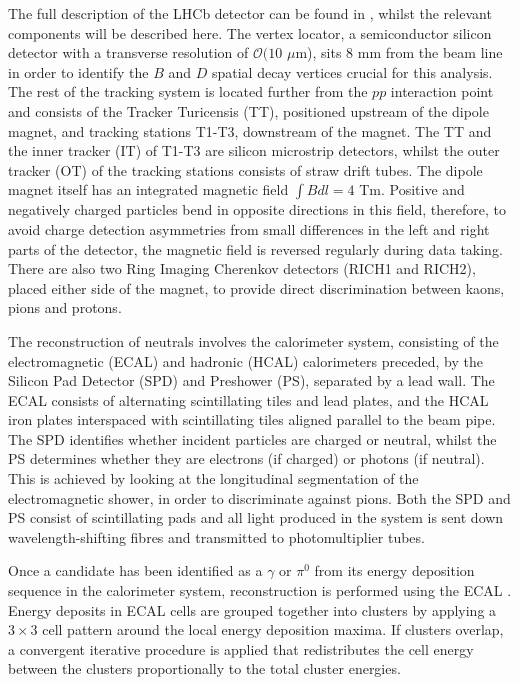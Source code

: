 \documentclass[oneside,12pt]{article}
\begin{document}
The full description of the LHCb detector can be found in \cite{LHCbDetector},
whilst the relevant components will be described here.  The vertex locator, a
semiconductor silicon detector with a transverse resolution of $\mathcal{O}(10$
$\mu$m), sits $8$ mm from the beam line in order to identify the $B$ and $D$
spatial decay vertices crucial for this analysis. The rest of the tracking
system is located further from the $pp$ interaction point and consists of the
Tracker Turicensis (TT), positioned upstream of the dipole magnet, and tracking
stations T1-T3, downstream of the magnet. The TT and the inner tracker (IT) of
T1-T3 are silicon microstrip detectors, whilst the outer tracker (OT) of the
tracking stations consists of straw drift tubes. The dipole magnet itself has an
integrated magnetic field $\int B dl = 4$ Tm.  Positive and negatively charged
particles bend in opposite directions in this field, therefore, to avoid charge
detection asymmetries from small differences in the left and right parts of the
detector, the magnetic field is reversed regularly during data taking.  There
are also two Ring Imaging Cherenkov detectors (RICH1 and RICH2), placed either
side of the magnet, to provide direct discrimination between kaons, pions and
protons.

The reconstruction of neutrals involves the calorimeter system, consisting of
the electromagnetic (ECAL) and hadronic (HCAL) calorimeters preceded, by the
Silicon Pad Detector (SPD) and Preshower (PS), separated by a lead wall. The
ECAL consists of alternating scintillating tiles and lead plates, and the HCAL
iron plates interspaced with scintillating tiles aligned parallel to the beam
pipe. The SPD identifies whether incident particles are charged or neutral,
whilst the PS determines whether they are electrons (if charged) or photons (if
neutral). This is achieved by looking at the longitudinal segmentation of the
electromagnetic shower, in order to discriminate against pions. Both the SPD and
PS consist of scintillating pads and all light produced in the system is sent
down wavelength-shifting fibres and transmitted to photomultiplier tubes.

Once a candidate has been identified as a $\gamma$ or $\pi^0$ from its energy
deposition sequence in the calorimeter system, reconstruction is performed using
the ECAL \cite{NeutralReconstruction}. Energy deposits in ECAL cells are grouped
together into clusters by applying a $3\times3$ cell pattern around the local
energy deposition maxima. If clusters overlap, a convergent iterative procedure
is applied that redistributes the cell energy between the clusters
proportionally to the total cluster energies.
\end{document}

